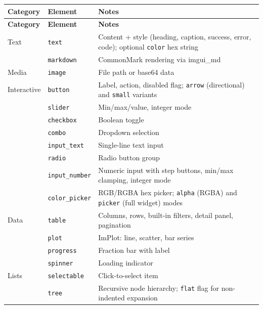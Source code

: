 \documentclass[a4paper,10pt]{article}
\newcommand{\elem}[1]{\texttt{#1}}
\newcommand{\field}[1]{\texttt{#1}}
\begin{document}
\begin{center}
\begin{longtable}{llp{6cm}}
\toprule
\textbf{Category} & \textbf{Element} & \textbf{Notes} \\
\midrule
\endfirsthead
\toprule
\textbf{Category} & \textbf{Element} & \textbf{Notes} \\
\midrule
\endhead
Text        & \elem{text}              & Content + style (heading, caption, success, error, code);
              optional \field{color} hex string \\
            & \elem{markdown}          & CommonMark rendering via imgui\_md \\
\midrule
Media       & \elem{image}             & File path or base64 data \\
\midrule
Interactive & \elem{button}            & Label, action, disabled flag;
              \field{arrow} (directional) and \field{small} variants \\
            & \elem{slider}            & Min/max/value, integer mode \\
            & \elem{checkbox}          & Boolean toggle \\
            & \elem{combo}             & Dropdown selection \\
            & \elem{input\_text}       & Single-line text input \\
            & \elem{radio}             & Radio button group \\
            & \elem{input\_number}     & Numeric input with step buttons, min/max clamping,
              integer mode \\
            & \elem{color\_picker}     & RGB/RGBA hex picker;
              \field{alpha} (RGBA) and \field{picker} (full widget) modes \\
\midrule
Data        & \elem{table}             & Columns, rows, built-in filters, detail panel, pagination \\
            & \elem{plot}              & ImPlot: line, scatter, bar series \\
            & \elem{progress}          & Fraction bar with label \\
            & \elem{spinner}           & Loading indicator \\
\midrule
Lists       & \elem{selectable}        & Click-to-select item \\
            & \elem{tree}              & Recursive node hierarchy;
              \field{flat} flag for non-indented expansion \\

\end{longtable}
\end{center}
\end{document}
